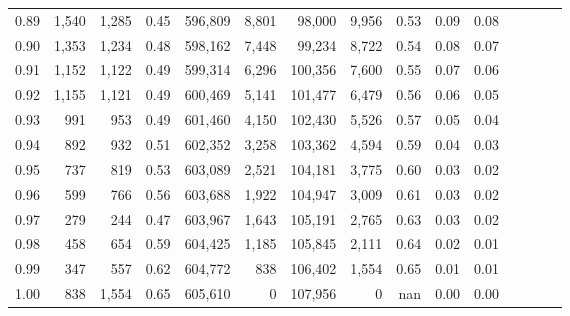\begin{tabular}{rrrcrrrrrrrrrrr}
0.89 &   1,540 &  1,285 &                                       0.45 &  596,809 &    8,801 &   98,000 &    9,956 &  0.53 &  0.09 &                         0.08 \\
0.90 &   1,353 &  1,234 &                                       0.48 &  598,162 &    7,448 &   99,234 &    8,722 &  0.54 &  0.08 &                         0.07 \\
0.91 &   1,152 &  1,122 &                                       0.49 &  599,314 &    6,296 &  100,356 &    7,600 &  0.55 &  0.07 &                         0.06 \\
0.92 &   1,155 &  1,121 &                                       0.49 &  600,469 &    5,141 &  101,477 &    6,479 &  0.56 &  0.06 &                         0.05 \\
0.93 &     991 &    953 &                                       0.49 &  601,460 &    4,150 &  102,430 &    5,526 &  0.57 &  0.05 &                         0.04 \\
0.94 &     892 &    932 &                                       0.51 &  602,352 &    3,258 &  103,362 &    4,594 &  0.59 &  0.04 &                         0.03 \\
0.95 &     737 &    819 &                                       0.53 &  603,089 &    2,521 &  104,181 &    3,775 &  0.60 &  0.03 &                         0.02 \\
0.96 &     599 &    766 &                                       0.56 &  603,688 &    1,922 &  104,947 &    3,009 &  0.61 &  0.03 &                         0.02 \\
0.97 &     279 &    244 &                                       0.47 &  603,967 &    1,643 &  105,191 &    2,765 &  0.63 &  0.03 &                         0.02 \\
0.98 &     458 &    654 &                                       0.59 &  604,425 &    1,185 &  105,845 &    2,111 &  0.64 &  0.02 &                         0.01 \\
0.99 &     347 &    557 &                                       0.62 &  604,772 &      838 &  106,402 &    1,554 &  0.65 &  0.01 &                         0.01 \\
1.00 &     838 &  1,554 &                                       0.65 &  605,610 &        0 &  107,956 &        0 &   nan &  0.00 &                         0.00 \\
\bottomrule
\end{tabular}
